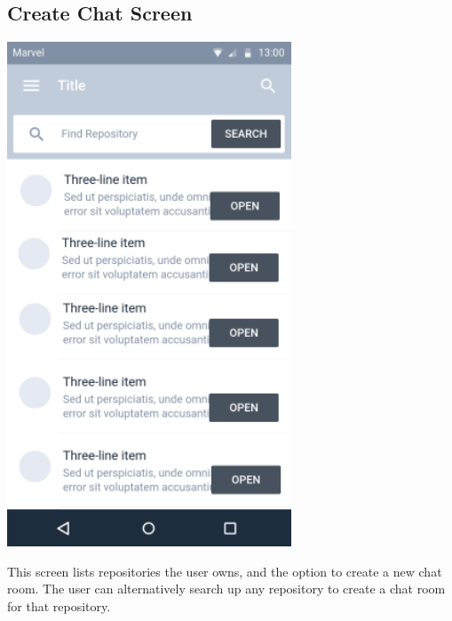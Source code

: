 \documentclass{report}
\begin{document}
\subsection{Create Chat Screen}
\begin{center}
    \includegraphics[scale=0.6]{design-create-chat}
\end{center}
This screen lists repositories the user owns, and the option to create a new chat room. The user can alternatively search up any repository to create a chat room for that repository.

\newpage
\end{document}
